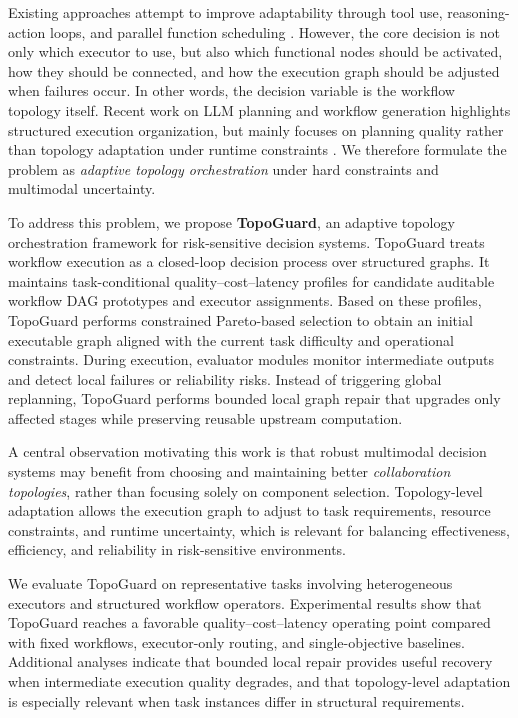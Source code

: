 \documentclass[manuscript,review,anonymous]{acmart}
\begin{document}
Existing approaches attempt to improve adaptability through tool use, reasoning-action loops, and parallel function scheduling \cite{schick2023toolformer,yao2023react,kim2024llm}. However, the core decision is not only which executor to use, but also which functional nodes should be activated, how they should be connected, and how the execution graph should be adjusted when failures occur. In other words, the decision variable is the workflow topology itself. Recent work on LLM planning and workflow generation highlights structured execution organization, but mainly focuses on planning quality rather than topology adaptation under runtime constraints \cite{huang2024understanding,zhai2025survey,li2024autoflow,zhang2024aflow,fan2024workflowllm}. We therefore formulate the problem as \emph{adaptive topology orchestration} under hard constraints and multimodal uncertainty.

To address this problem, we propose \textbf{TopoGuard}, an adaptive topology orchestration framework for risk-sensitive decision systems. TopoGuard treats workflow execution as a closed-loop decision process over structured graphs. It maintains task-conditional quality--cost--latency profiles for candidate auditable workflow DAG prototypes and executor assignments. Based on these profiles, TopoGuard performs constrained Pareto-based selection to obtain an initial executable graph aligned with the current task difficulty and operational constraints. During execution, evaluator modules monitor intermediate outputs and detect local failures or reliability risks. Instead of triggering global replanning, TopoGuard performs bounded local graph repair that upgrades only affected stages while preserving reusable upstream computation.

A central observation motivating this work is that robust multimodal decision systems may benefit from choosing and maintaining better \emph{collaboration topologies}, rather than focusing solely on component selection. Topology-level adaptation allows the execution graph to adjust to task requirements, resource constraints, and runtime uncertainty, which is relevant for balancing effectiveness, efficiency, and reliability in risk-sensitive environments.

We evaluate TopoGuard on representative tasks involving heterogeneous executors and structured workflow operators. Experimental results show that TopoGuard reaches a favorable quality--cost--latency operating point compared with fixed workflows, executor-only routing, and single-objective baselines. Additional analyses indicate that bounded local repair provides useful recovery when intermediate execution quality degrades, and that topology-level adaptation is especially relevant when task instances differ in structural requirements.
\end{document}
